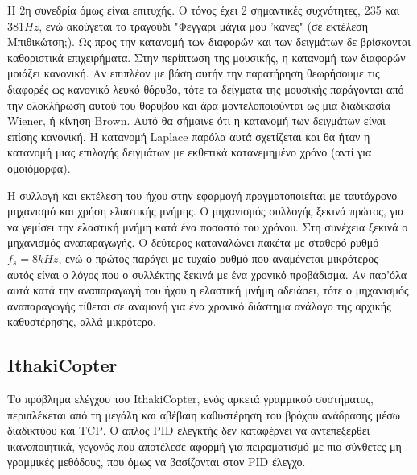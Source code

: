 \documentclass[a4paper,10pt]{article}
\begin{document}
Η 2η συνεδρία όμως είναι επιτυχής. Ο τόνος έχει 2 σημαντικές συχνότητες, 235 και 381$Hz$, ενώ ακούγεται το τραγούδι "Φεγγάρι μάγια μου 'κανες" (σε εκτέλεση Μπιθικώτση;). Ως προς την κατανομή των διαφορών και των δειγμάτων δε βρίσκονται καθοριστικά επιχειρήματα.
Στην περίπτωση της μουσικής, η κατανομή των διαφορών μοιάζει κανονική. Αν επιπλέον με βάση αυτήν την παρατήρηση θεωρήσουμε τις διαφορές ως κανονικό λευκό θόρυβο, τότε τα δείγματα της μουσικής παράγονται από την ολοκλήρωση αυτού του θορύβου και άρα μοντελοποιούνται ως μια διαδικασία \foreignlanguage{english}{Wiener}, ή κίνηση \foreignlanguage{english}{Brown}.
Αυτό θα σήμαινε ότι η κατανομή των δειγμάτων είναι επίσης κανονική. Η κατανομή Laplace παρόλα αυτά σχετίζεται και θα ήταν η κατανομή μιας επιλογής δειγμάτων με εκθετικά κατανεμημένο χρόνο (αντί για ομοιόμορφα).

Η συλλογή και εκτέλεση του ήχου στην εφαρμογή πραγματοποιείται με ταυτόχρονο μηχανισμό και χρήση ελαστικής μνήμης. Ο μηχανισμός συλλογής ξεκινά πρώτος, για να γεμίσει την ελαστική μνήμη κατά ένα ποσοστό του χρόνου. Στη συνέχεια ξεκινά ο μηχανισμός αναπαραγωγής. Ο δεύτερος καταναλώνει πακέτα με σταθερό ρυθμό $f_s= 8kHz$, ενώ ο πρώτος παράγει με τυχαίο ρυθμό που αναμένεται μικρότερος - αυτός είναι ο λόγος που ο συλλέκτης ξεκινά με ένα χρονικό προβάδισμα.
Αν παρ'όλα αυτά κατά την αναπαραγωγή του ήχου η ελαστική μνήμη αδειάσει, τότε ο μηχανισμός αναπαραγωγής τίθεται σε αναμονή για ένα χρονικό διάστημα ανάλογο της αρχικής καθυστέρησης, αλλά μικρότερο.

\subsection{\foreignlanguage{english}{IthakiCopter}}
Το πρόβλημα ελέγχου του \foreignlanguage{english}{IthakiCopter}, ενός αρκετά γραμμικού συστήματος, περιπλέκεται από τη μεγάλη και αβέβαιη καθυστέρηση του βρόχου ανάδρασης μέσω διαδικτύου και \foreignlanguage{english}{TCP}. Ο απλός \foreignlanguage{english}{PID} ελεγκτής δεν καταφέρνει να αντεπεξέρθει ικανοποιητικά, γεγονός που αποτέλεσε αφορμή για πειραματισμό με πιο σύνθετες μη γραμμικές μεθόδους, που όμως να βασίζονται στον \foreignlanguage{english}{PID} έλεγχο.
\end{document}
